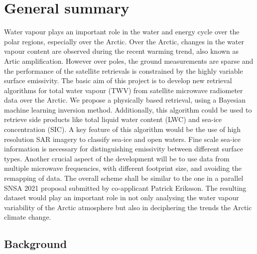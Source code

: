 \documentclass[12pt,oneside,a4paper]{article}
\begin{document}
	
	
	\thispagestyle{empty}
	\vspace*{-10mm}
	\noindent
	\textbf{\Large \LongTitle}




\section{General summary}

Water vapour plays an important role in the water and energy cycle over the polar regions, especially over the Arctic. Over the Arctic, changes in the water vapour content are observed during the recent warming trend, also known as Artic amplification. However over poles, the ground measurements are sparse and the performance of the satellite retrievals is constrained by the highly variable surface emissivity. The basic aim of this project is to develop new retrieval algorithms for total water vapour (TWV) from satellite microwave radiometer data over the Arctic. We propose a physically based retrieval, using a Bayesian machine learning inversion method. Additionally, this algorithm could be used to retrieve side products like total liquid water content (LWC) and sea-ice concentration (SIC). A key feature of this algorithm would be the use of high resolution SAR imagery to classify sea-ice and open waters. Fine scale sea-ice information is necessary for distinguishing emissivity between different surface types. Another crucial aspect of the development will be to use data from multiple microwave frequencies, with different footprint size, and avoiding the remapping of data. The overall scheme shall be similar to the one in a parallel SNSA 2021 proposal submitted by co-applicant Patrick Eriksson.
The resulting dataset would play an important role in not only analysing the water vapour variability of the Arctic atmosphere but also in deciphering the trends the Arctic climate change.

\subsection{Background}
%
\label{sec:background}
\end{document}
